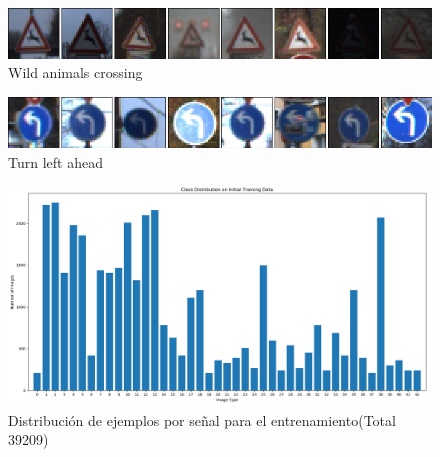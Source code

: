 		\begin{figure}[H]
			\begin{center}
			\includegraphics[width=1\textwidth]{images/desarrollo/imagenes/1__(32).png}
			\end{center}
			\begin{center}
			\caption{\small{Wild animals crossing}}
			\end{center}
			\vspace{-1.5em}
		\end{figure}

		\begin{figure}[H]
			\begin{center}
			\includegraphics[width=1\textwidth]{images/desarrollo/imagenes/1__(35).png}
			\end{center}
			\begin{center}
			\caption{\small{Turn left ahead}}
			\end{center}
			\vspace{-1.5em}
		\end{figure}


		\begin{figure}[H]
			\begin{center}
			\includegraphics[width=1\textwidth]{images/desarrollo/histograms/initial39209}
			\end{center}
			\begin{center}
			\caption{\small{Distribución de ejemplos por señal para el entrenamiento(Total 39209)}}
			\vspace{-1em}
		{\small{\fontsize{10}{16.8}\selectfont {Fuente propia}}}
			\end{center}
			\vspace{-1.5em}
		\end{figure}


